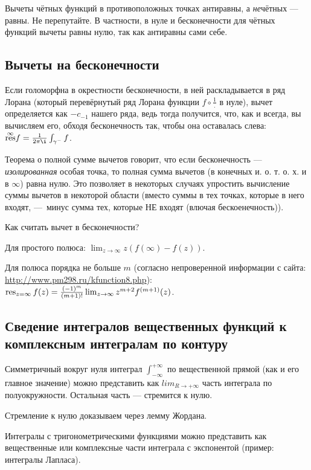 \documentclass[12pt, a4paper]{article}
\begin{document}
\begin{remark}\label{rem:res_inversed}
  Вычеты чётных функций в противоположных точках антиравны, а \textit{не}чётных — равны. Не перепутайте.
  В частности, в нуле и бесконечности для чётных функций вычеты равны нулю, так как антиравны сами себе.
\end{remark}

\subsection{Вычеты на бесконечности}

Если голоморфна в окрестности бесконечности, в ней раскладывается в ряд Лорана
(который перевёрнутый ряд Лорана функции $f \circ \frac{1}{.}$ в нуле), вычет определяется как $-c_{-1}$ нашего ряда,
ведь тогда получится, что, как и всегда, вы вычисляем его, обходя бесконечность так, чтобы она оставалась слева:
$\overset{\infty}{\res} f = \frac{1}{2 \pi \i}\int_{\gamma^{-}} f$.

Теорема о полной сумме вычетов говорит, что если бесконечность — \textit{изолированная} особая точка,
то полная сумма вычетов (в конечных и. о. т. о. х. и в $∞$) равна нулю.
Это позволяет в некоторых случаях упростить вычисление суммы вычетов в некоторой области
(вместо суммы в тех точках, которые в него входят, — минус сумма тех, которые НЕ входят (влючая бескоенечность)).

Как считать вычет в бесконечности?

Для простого полюса: $\lim_{z → ∞} z (f(∞) - f(z))$.

Для полюса порядка не больше $m$ (согласно непроверенной информации с сайта: \url{http://www.pm298.ru/kfunction8.php}): $\operatorname{res}_{z=\infty} f(z)=\frac{(-1)^m}{(m+1) !} \lim _{z \rightarrow \infty} z^{m+2} f^{(m+1)}(z)$.


\subsection{Сведение интегралов вещественных функций к комплексным интегралам по контуру}

Симметричный вокруг нуля интеграл $\int_{-\infty}^{+\infty}$ по вещественной прямой (как и его главное значение) можно представить как $lim_{R → +\infty} $ часть интеграла по полуокружности. Остальная часть — стремится к нулю.

Стремление к нулю доказываем через лемму Жордана.

Интегралы с тригонометрическими функциями можно представить как вещественные или комплексные части интеграла с экспонентой (пример: интегралы Лапласа).
\end{document}
